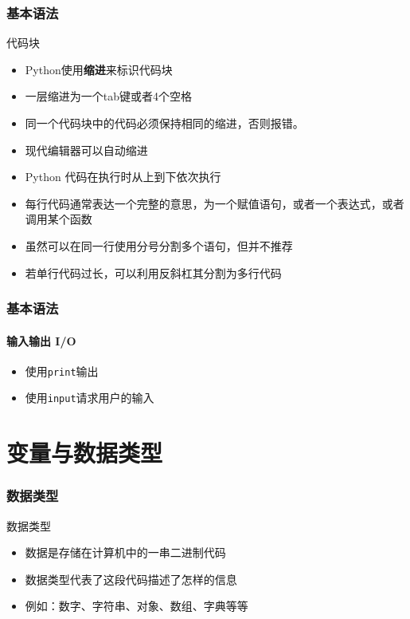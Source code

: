 \documentclass[10pt]{beamer}
\begin{document}
\begin{frame}
\frametitle{基本语法}
\begin{block}{代码块}
\begin{itemize}
    \item Python使用\textbf{缩进}来标识代码块
    \item 一层缩进为一个tab键或者4个空格
    \item 同一个代码块中的代码必须保持相同的缩进，否则报错。
    \item 现代编辑器可以自动缩进
\end{itemize}

\vspace{0.5cm}

\begin{itemize}
    \item Python 代码在执行时从上到下依次执行
    \item 每行代码通常表达一个完整的意思，为一个赋值语句，或者一个表达式，或者调用某个函数
    \item 虽然可以在同一行使用分号分割多个语句，但并不推荐
    \item 若单行代码过长，可以利用反斜杠其分割为多行代码
\end{itemize}
\end{block}
\end{frame}

\begin{frame}
    \frametitle{基本语法}
    \framesubtitle{输入输出 I/O}
    \begin{itemize}
        \item 使用\texttt{print}输出
        \item 使用\texttt{input}请求用户的输入
    \end{itemize}

\end{frame}

\section{变量与数据类型}

\begin{frame}
    \frametitle{数据类型}
    \begin{block}{数据类型}
        \begin{itemize}
            \item 数据是存储在计算机中的一串二进制代码
            \item 数据类型代表了这段代码描述了怎样的信息
            \item 例如：数字、字符串、对象、数组、字典等等
        \end{itemize}
    \end{block}
\end{frame}
\end{document}
